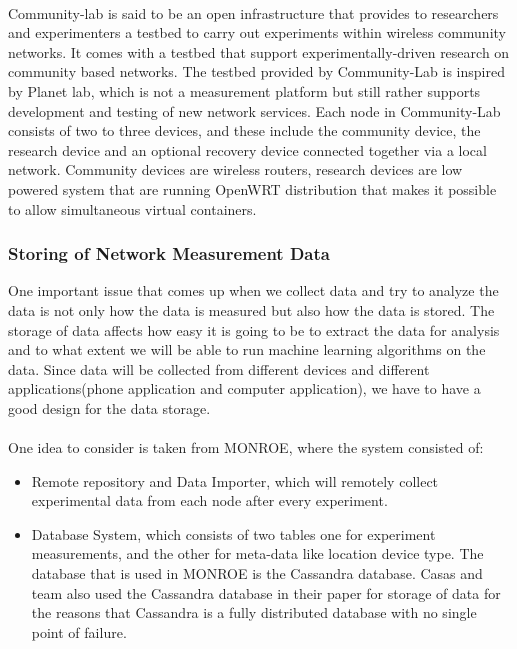 \paragraph{}
Community-lab is said to be an open infrastructure that provides to researchers and experimenters a testbed to carry out experiments within wireless community networks\cite{Rameshan:2013:MSC:2508222.2512838}.
It comes with a testbed that support experimentally-driven research on community based networks\cite{Braem:2013:CRC:2500098.2500108}.
The testbed provided by Community-Lab is inspired by Planet lab, which is not a measurement platform but still rather supports development and testing of new network services\cite{7076582,Braem:2015:AEQ:2830629.2830639}.
Each node in Community-Lab consists of two to three devices, and these include the community device, the research device and an optional recovery device connected together via a local network\cite{Rameshan:2013:MSC:2508222.2512838}.
Community devices are wireless routers, research devices are low powered system that are running OpenWRT distribution that makes it possible to allow simultaneous virtual containers\cite{Rameshan:2013:MSC:2508222.2512838}.
\subsubsection{Storing of Network Measurement Data}
One important issue that comes up when we collect data and try to analyze the data is not only how the data is measured but also how the data is stored.
The storage of data affects how easy it is going to be to extract the data for analysis and to what extent we will be able to run machine learning algorithms on the data.
Since data will be collected from different devices and different applications(phone application and computer application), we have to have a good design for the data storage.
\paragraph{}
One idea to consider is taken from MONROE\cite{7523537}, where the system consisted of:
\begin{itemize}
    \item  Remote repository and Data Importer, which will remotely collect experimental data from each node after every experiment.
    \item Database System, which consists of two tables one for experiment measurements, and the other for meta-data like location device type.
    The database that is used in MONROE is the Cassandra database.
    Casas and team also used the Cassandra database in their paper for storage of data for the reasons that Cassandra is a fully distributed database with no single point of failure\cite{8255998}.
\end{itemize}

